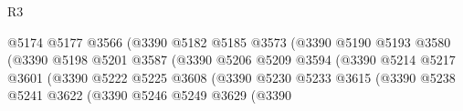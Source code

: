 \begin{lexlean}{R3}
\begin{coremodule}
                                                  @5174
                                                  @5177
                                                  @3566
                                                  (@3390
                                                    @5182
                                                    @5185
                                                    @3573
                                                    (@3390
                                                      @5190
                                                      @5193
                                                      @3580
                                                      (@3390
                                                        @5198
                                                        @5201
                                                        @3587
                                                        (@3390
                                                          @5206
                                                          @5209
                                                          @3594
                                                          (@3390
                                                            @5214
                                                            @5217
                                                            @3601
                                                            (@3390
                                                              @5222
                                                              @5225
                                                              @3608
                                                              (@3390
                                                                @5230
                                                                @5233
                                                                @3615
                                                                (@3390
                                                                  @5238
                                                                  @5241
                                                                  @3622
                                                                  (@3390
                                                                    @5246
                                                                    @5249
                                                                    @3629
                                                                    (@3390

\end{coremodule}
\end{lexlean}
